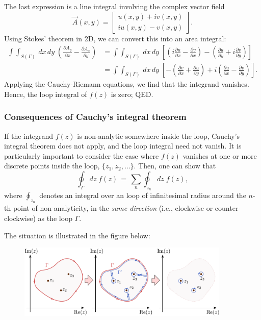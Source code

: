 \documentclass[10pt,a4paper]{article}
\begin{document}
The last expression is a line integral involving the complex vector
field
\begin{equation}
\vec{A}(x,y) = \begin{bmatrix}u(x,y) + i v(x,y) \\ iu(x,y) - v(x,y)\end{bmatrix}.
\end{equation}
Using Stokes' theorem in 2D, we can convert this into an area integral:
\begin{align}
  \int\!\!\int_{S(\Gamma)}\, dx \,dy \; \left(\frac{\partial A_y}{\partial x} - \frac{\partial A_x}{\partial y}\right) &= \int\!\!\int_{S(\Gamma)}\, dx \,dy \; \left[\left(i\frac{\partial u}{\partial x} - \frac{\partial v}{\partial x}\right) - \left(\frac{\partial u}{\partial y} + i \frac{\partial v}{\partial y}\right)\right] \\ &= \int\!\!\int_{S(\Gamma)}\, dx \,dy \; \left[- \left(\frac{\partial v}{\partial x} + \frac{\partial u}{\partial y} \right) + i\left(\frac{\partial u}{\partial x} - \frac{\partial v}{\partial y}\right)\right].
\end{align}
Applying the Cauchy-Riemann equations, we find that the integrand
vanishes. Hence, the loop integral of $f(z)$ is zero; QED.

\subsubsection{Consequences of Cauchy's integral theorem}
\label{consequences-of-cauchys-integral-theorem}

If the integrand $f(z)$ is non-analytic somewhere inside the loop,
Cauchy's integral theorem does not apply, and the loop integral need not
vanish. It is particularly important to consider the case where $f(z)$
vanishes at one or more discrete points inside the loop,
$\{z_1, z_2, \dots\}$. Then, one can show that
\begin{equation}
\oint_\Gamma dz\; f(z) \,=\, \sum_{n} \oint_{z_n} dz\; f(z),
\end{equation}
where $\oint_{z_n}$ denotes an integral over an loop of infinitesimal
radius around the $n$-th point of non-analyticity, in the \emph{same
direction} (i.e., clockwise or counter-clockwise) as the loop
$\Gamma$.

The situation is illustrated in the figure below:

\begin{figure}[h]
  \centering\includegraphics[width=0.9\textwidth]{contour_deformation}
\end{figure}
\end{document}
